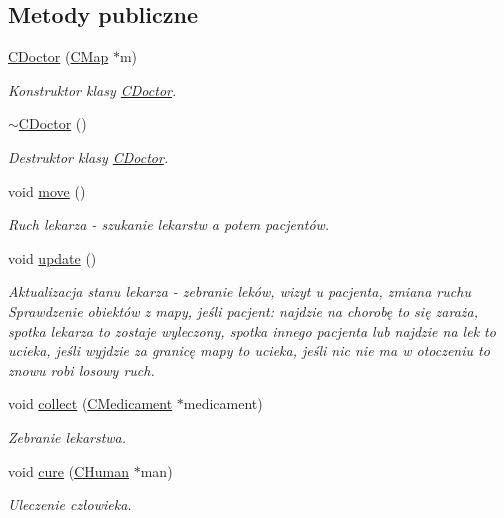 \subsection*{Metody publiczne}
\begin{DoxyCompactItemize}
\item 
\mbox{\hyperlink{class_c_doctor_ae175370d7f98eb6281d65029b9a9321f}{C\+Doctor}} (\mbox{\hyperlink{class_c_map}{C\+Map}} $\ast$m)
\begin{DoxyCompactList}\small\item\em Konstruktor klasy \mbox{\hyperlink{class_c_doctor}{C\+Doctor}}. \end{DoxyCompactList}\item 
\mbox{\hyperlink{class_c_doctor_a028188391f952493500ed191b40cee20}{$\sim$\+C\+Doctor}} ()
\begin{DoxyCompactList}\small\item\em Destruktor klasy \mbox{\hyperlink{class_c_doctor}{C\+Doctor}}. \end{DoxyCompactList}\item 
void \mbox{\hyperlink{class_c_doctor_a9fa8e8e952def12024b70231785d07be}{move}} ()
\begin{DoxyCompactList}\small\item\em Ruch lekarza -\/ szukanie lekarstw a potem pacjentów. \end{DoxyCompactList}\item 
void \mbox{\hyperlink{class_c_doctor_a9ae22158d776a4c489158b9b944fbe80}{update}} ()
\begin{DoxyCompactList}\small\item\em Aktualizacja stanu lekarza -\/ zebranie leków, wizyt u pacjenta, zmiana ruchu Sprawdzenie obiektów z mapy, jeśli pacjent\+: najdzie na chorobę to się zaraża, spotka lekarza to zostaje wyleczony, spotka innego pacjenta lub najdzie na lek to ucieka, jeśli wyjdzie za granicę mapy to ucieka, jeśli nic nie ma w otoczeniu to znowu robi losowy ruch. \end{DoxyCompactList}\item 
void \mbox{\hyperlink{class_c_doctor_a4f1c052261657a38df79427f6d448d1b}{collect}} (\mbox{\hyperlink{class_c_medicament}{C\+Medicament}} $\ast$medicament)
\begin{DoxyCompactList}\small\item\em Zebranie lekarstwa. \end{DoxyCompactList}\item 
void \mbox{\hyperlink{class_c_doctor_a0f9f393a967e7294e31779cbb8f0f401}{cure}} (\mbox{\hyperlink{class_c_human}{C\+Human}} $\ast$man)
\begin{DoxyCompactList}\small\item\em Uleczenie człowieka. \end{DoxyCompactList}\end{DoxyCompactItemize}

